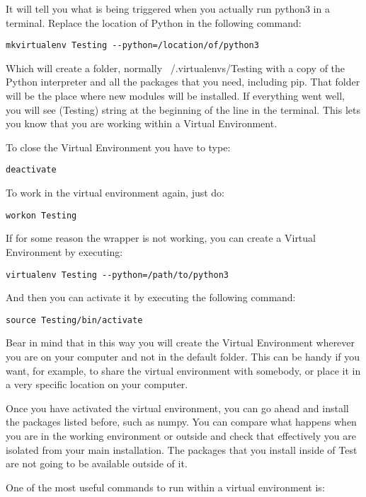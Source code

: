 It will tell you what is being triggered when you actually run python3 in a terminal. Replace the location of Python in the following command:
\begin{verbatim}
mkvirtualenv Testing --python=/location/of/python3
\end{verbatim}

Which will create a folder, normally ~/.virtualenvs/Testing with a copy of the Python interpreter and all the packages that you need, including pip. That folder will be the place where new modules will be installed. If everything went well, you will see (Testing) string at the beginning of the line in the terminal. This lets you know that you are working within a Virtual Environment.

To close the Virtual Environment you have to type:

\begin{verbatim}
deactivate
\end{verbatim}

To work in the virtual environment again, just do:
\begin{verbatim}
workon Testing
\end{verbatim}

If for some reason the wrapper is not working, you can create a Virtual Environment by executing:
\begin{verbatim}
virtualenv Testing --python=/path/to/python3
\end{verbatim}
And then you can activate it by executing the following command:
\begin{verbatim}
source Testing/bin/activate 
\end{verbatim}

Bear in mind that in this way you will create the Virtual Environment wherever you are on your computer and not in the default folder. This can be handy if you want, for example, to share the virtual environment with somebody, or place it in a very specific location on your computer.

Once you have activated the virtual environment, you can go ahead and install the packages listed before, such as numpy. You can compare what happens when you are in the working environment or outside and check that effectively you are isolated from your main installation. The packages that you install inside of Test are not going to be available outside of it.

One of the most useful commands to run within a virtual environment is:

